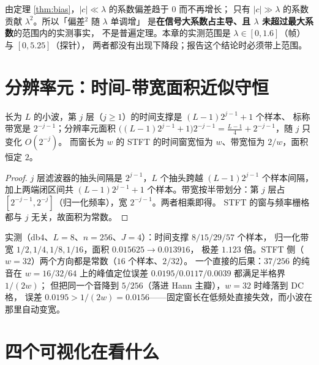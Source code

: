 \begin{remark}[「偏差$^2$ 单调」的适用范围]
\label{rem:bias-range}
由定理 \ref{thm:bias}，$|c|\ll\lambda$ 的系数偏差趋于 $0$ 而不再增长；
只有 $|c|\gg\lambda$ 的系数贡献 $\lambda^2$。所以「偏差$^2$ 随 $\lambda$ 单调增」
是\textbf{在信号大系数占主导、且 $\lambda$ 未超过最大系数}的范围内的实测事实，
不是普遍定理。本章的实测范围是 $\lambda\in[0,1.6]$（帧）与 $[0,5.25]$（探针），
两者都没有出现下降段；报告这个结论时必须带上范围。
\end{remark}

\section{分辨率元：时间-带宽面积近似守恒}

\begin{theorem}[两种分辨率元]
\label{thm:cell}
长为 $L$ 的小波，第 $j$ 层（$j\ge1$）的时间支撑是 $(L-1)2^{j-1}+1$ 个样本、
标称带宽是 $2^{-j-1}$；分辨率元面积
$\big((L-1)2^{j-1}+1\big)2^{-j-1}=\frac{L-1}{4}+2^{-j-1}$，随 $j$ 只变化 $O(2^{-j})$。
而窗长为 $w$ 的 STFT 的时间窗宽恒为 $w$、带宽恒为 $2/w$，面积恒定 $2$。
\end{theorem}

\begin{proof}
$j$ 层滤波器的抽头间隔是 $2^{j-1}$，$L$ 个抽头跨越 $(L-1)2^{j-1}$ 个样本间隔，
加上两端闭区间共 $(L-1)2^{j-1}+1$ 个样本。带宽按半带划分：第 $j$ 层占
$[2^{-j-1},2^{-j}]$（归一化频率），宽 $2^{-j-1}$。两者相乘即得。
STFT 的窗与频率栅格都与 $j$ 无关，故面积为常数。
\end{proof}

实测（db4、$L=8$、$n=256$、$J=4$）：时间支撑 $8/15/29/57$ 个样本，
归一化带宽 $1/2,1/4,1/8,1/16$，面积 $0.015625\to0.013916$，
极差 $1.123$ 倍。STFT 侧（$w=32$）两个方向都是常数（$16$ 个样本、$2/32$）。
一个直接的后果：$37/256$ 的纯音在 $w=16/32/64$ 上的峰值定位误差
$0.0195/0.0117/0.0039$ 都满足半格界 $1/(2w)$；
但把同一个音降到 $5/256$（落进 Hann 主瓣），$w=32$ 时峰落到 DC 格，
误差 $0.0195>1/(2w)=0.0156$——固定窗长在低频处直接失效，而小波在那里自动变宽。

\section{四个可视化在看什么}

